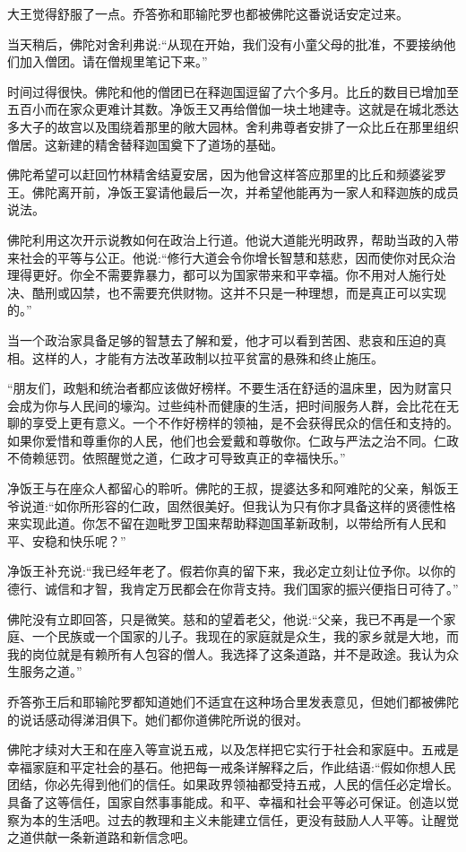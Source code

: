 \documentclass[12pt,twoside,openany]{book}
\begin{document}
大王觉得舒服了一点。乔答弥和耶输陀罗也都被佛陀这番说话安定过来。

当天稍后，佛陀对舍利弗说:“从现在开始，我们没有小童父母的批准，不要接纳他们加入僧团。请在僧规里笔记下来。”

时间过得很快。佛陀和他的僧团已在释迦国逗留了六个多月。比丘的数目已增加至五百小而在家众更难计其数。净饭王又再给僧伽一块土地建寺。这就是在城北悉达多大子的故宫以及围绕着那里的敞大园林。舍利弗尊者安排了一众比丘在那里组织僧居。这新建的精舍替释迦国奠下了道场的基础。

佛陀希望可以赶回竹林精舍结夏安居，因为他曾这样答应那里的比丘和频婆娑罗王。佛陀离开前，净饭王宴请他最后一次，并希望他能再为一家人和释迦族的成员说法。

佛陀利用这次开示说教如何在政治上行道。他说大道能光明政界，帮助当政的入带来社会的平等与公正。他说:“修行大道会令你增长智慧和慈悲，因而使你对民众治理得更好。你全不需要靠暴力，都可以为国家带来和平幸福。你不用对人施行处决、酷刑或囚禁，也不需要充供财物。这并不只是一种理想，而是真正可以实现的。”

当一个政治家具备足够的智慧去了解和爱，他才可以看到苦困、悲哀和压迫的真相。这样的人，才能有方法改革政制以拉平贫富的悬殊和终止施压。

“朋友们，政魁和统治者都应该做好榜样。不要生活在舒适的温床里，因为财富只会成为你与人民间的壕沟。过些纯朴而健康的生活，把时间服务人群，会比花在无聊的享受上更有意义。一个不作好榜样的领袖，是不会获得民众的信任和支持的。如果你爱惜和尊重你的人民，他们也会爱戴和尊敬你。仁政与严法之治不同。仁政不倚赖惩罚。依照醒觉之道，仁政才可导致真正的幸福快乐。”

净饭王与在座众人都留心的聆听。佛陀的王叔，提婆达多和阿难陀的父亲，斛饭王爷说道:“如你所形容的仁政，固然很美好。但我认为只有你才具备这样的贤德性格来实现此道。你怎不留在迦毗罗卫国来帮助释迦国革新政制，以带给所有人民和平、安稳和快乐呢？”

净饭王补充说:“我已经年老了。假若你真的留下来，我必定立刻让位予你。以你的德行、诚信和才智，我肯定万民都会在你背支持。我们国家的振兴便指日可待了。”

佛陀没有立即回答，只是微笑。慈和的望着老父，他说:“父亲，我已不再是一个家庭、一个民族或一个国家的儿子。我现在的家庭就是众生，我的家乡就是大地，而我的岗位就是有赖所有人包容的僧人。我选择了这条道路，并不是政途。我认为众生服务之道。”

乔答弥王后和耶输陀罗都知道她们不适宜在这种场合里发表意见，但她们都被佛陀的说话感动得涕泪俱下。她们都你道佛陀所说的很对。

佛陀才续对大王和在座入等宣说五戒，以及怎样把它实行于社会和家庭中。五戒是幸福家庭和平定社会的基石。他把每一戒条详解释之后，作此结语:“假如你想人民团结，你必先得到他们的信任。如果政界领袖都受持五戒，人民的信任必定增长。具备了这等信任，国家自然事事能成。和平、幸福和社会平等必可保证。创造以觉察为本的生活吧。过去的教理和主义未能建立信任，更没有鼓励人人平等。让醒觉之道供献一条新道路和新信念吧。
\end{document}
